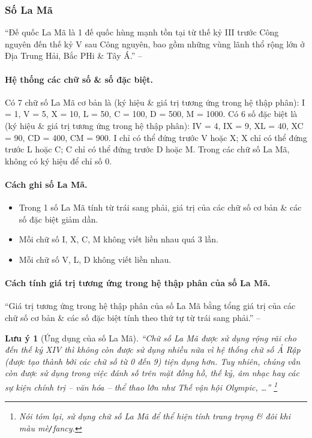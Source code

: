 \documentclass{article}
\numberwithin{equation}{section}
\newtheorem{remark}{Lưu ý}[section]
\begin{document}
\subsubsection{Số La Mã}
``Đế quốc La Mã là 1 đế quốc hùng mạnh tồn tại từ thế kỷ III trước Công nguyên đến thế kỷ V sau Công nguyên, bao gồm những vùng lãnh thổ rộng lớn ở Địa Trung Hải, Bắc PHi \& Tây Á.'' -- \cite[p. 14]{Thai_Anh_Dat_Ha_Loan_Nam_Quang_Toan_6_tap_1}

\paragraph{Hệ thống các chữ số \& số đặc biệt.} Có 7 chữ số La Mã cơ bản là (ký hiệu \& giá trị tương ứng trong hệ thập phân): I = 1, V = 5, X = 10, L = 50, C = 100, D = 500, M = 1000. Có 6 số đặc biệt là (ký hiệu \& giá trị tương ứng trong hệ thập phân): IV = 4, IX = 9, XL = 40, XC = 90, CD = 400, CM = 900. I chỉ có thể đứng trước V hoặc X; X chỉ có thể đứng trước L hoặc C; C chỉ có thể đứng trước D hoặc M. Trong các chữ số La Mã, không có ký hiệu để chỉ số 0.

\paragraph{Cách ghi số La Mã.}
\begin{itemize}
	\item Trong 1 số La Mã tính từ trái sang phải, giá trị của các chữ số cơ bản \& các số đặc biệt giảm dần.
	\item Mỗi chữ số I, X, C, M không viết liền nhau quá 3 lần.
	\item Mỗi chữ số V, L, D không viết liền nhau.
\end{itemize}

\paragraph{Cách tính giá trị tương ứng trong hệ thập phân của số La Mã.} ``Giá trị tương ứng trong hệ thập phân của số La Mã bằng tổng giá trị của các chữ số cơ bản \& các số đặc biệt tính theo thứ tự từ trái sang phải.'' -- \cite[p. 14]{Thai_Anh_Dat_Ha_Loan_Nam_Quang_Toan_6_tap_1}

\begin{remark}[Ứng dụng của số La Mã]
	``Chữ số La Mã được sử dụng rộng rãi cho đến thế kỷ XIV thì không còn được sử dụng nhiều nữa vì hệ thống chữ số Ả Rập (được tạo thành bởi các chữ số từ 0 đến 9) tiện dụng hơn. Tuy nhiên, chúng vẫn còn được sử dụng trong việc đánh số trên mặt đồng hồ, thế kỷ, âm nhạc hay các sự kiện chính trị -- văn hóa -- thể thao lớn như Thế vận hội Olympic, \ldots'' \footnote{Nói tóm lại, sử dụng chữ số La Mã để thể hiện tính trang trọng \& đôi khi màu mè\texttt{/}fancy.}
\end{remark}
\end{document}
